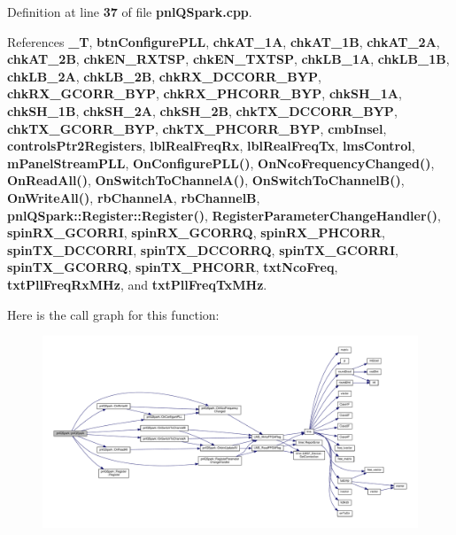 Definition at line {\bf 37} of file {\bf pnl\+Q\+Spark.\+cpp}.



References {\bf \+\_\+T}, {\bf btn\+Configure\+P\+LL}, {\bf chk\+A\+T\+\_\+1A}, {\bf chk\+A\+T\+\_\+1B}, {\bf chk\+A\+T\+\_\+2A}, {\bf chk\+A\+T\+\_\+2B}, {\bf chk\+E\+N\+\_\+\+R\+X\+T\+SP}, {\bf chk\+E\+N\+\_\+\+T\+X\+T\+SP}, {\bf chk\+L\+B\+\_\+1A}, {\bf chk\+L\+B\+\_\+1B}, {\bf chk\+L\+B\+\_\+2A}, {\bf chk\+L\+B\+\_\+2B}, {\bf chk\+R\+X\+\_\+\+D\+C\+C\+O\+R\+R\+\_\+\+B\+YP}, {\bf chk\+R\+X\+\_\+\+G\+C\+O\+R\+R\+\_\+\+B\+YP}, {\bf chk\+R\+X\+\_\+\+P\+H\+C\+O\+R\+R\+\_\+\+B\+YP}, {\bf chk\+S\+H\+\_\+1A}, {\bf chk\+S\+H\+\_\+1B}, {\bf chk\+S\+H\+\_\+2A}, {\bf chk\+S\+H\+\_\+2B}, {\bf chk\+T\+X\+\_\+\+D\+C\+C\+O\+R\+R\+\_\+\+B\+YP}, {\bf chk\+T\+X\+\_\+\+G\+C\+O\+R\+R\+\_\+\+B\+YP}, {\bf chk\+T\+X\+\_\+\+P\+H\+C\+O\+R\+R\+\_\+\+B\+YP}, {\bf cmb\+Insel}, {\bf controls\+Ptr2\+Registers}, {\bf lbl\+Real\+Freq\+Rx}, {\bf lbl\+Real\+Freq\+Tx}, {\bf lms\+Control}, {\bf m\+Panel\+Stream\+P\+LL}, {\bf On\+Configure\+P\+L\+L()}, {\bf On\+Nco\+Frequency\+Changed()}, {\bf On\+Read\+All()}, {\bf On\+Switch\+To\+Channel\+A()}, {\bf On\+Switch\+To\+Channel\+B()}, {\bf On\+Write\+All()}, {\bf rb\+ChannelA}, {\bf rb\+ChannelB}, {\bf pnl\+Q\+Spark\+::\+Register\+::\+Register()}, {\bf Register\+Parameter\+Change\+Handler()}, {\bf spin\+R\+X\+\_\+\+G\+C\+O\+R\+RI}, {\bf spin\+R\+X\+\_\+\+G\+C\+O\+R\+RQ}, {\bf spin\+R\+X\+\_\+\+P\+H\+C\+O\+RR}, {\bf spin\+T\+X\+\_\+\+D\+C\+C\+O\+R\+RI}, {\bf spin\+T\+X\+\_\+\+D\+C\+C\+O\+R\+RQ}, {\bf spin\+T\+X\+\_\+\+G\+C\+O\+R\+RI}, {\bf spin\+T\+X\+\_\+\+G\+C\+O\+R\+RQ}, {\bf spin\+T\+X\+\_\+\+P\+H\+C\+O\+RR}, {\bf txt\+Nco\+Freq}, {\bf txt\+Pll\+Freq\+Rx\+M\+Hz}, and {\bf txt\+Pll\+Freq\+Tx\+M\+Hz}.



Here is the call graph for this function\+:
\nopagebreak
\begin{figure}[H]
\begin{center}
\leavevmode
\includegraphics[width=350pt]{d5/d92/classpnlQSpark_a144727146c22d930542be934f1166e59_cgraph}
\end{center}
\end{figure}


